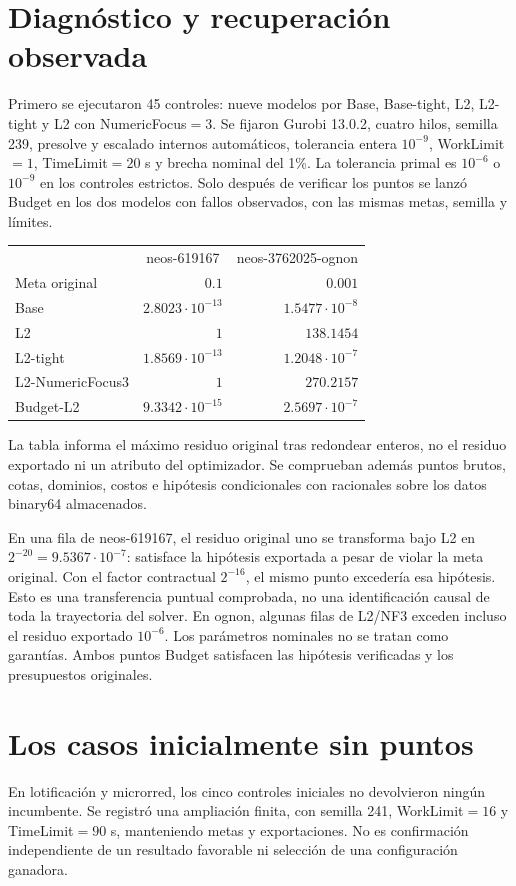 \documentclass[10pt,a4paper]{article}
\begin{document}
\section{Diagnóstico y recuperación observada}
Primero se ejecutaron 45 controles: nueve modelos por Base, Base-tight, L2,
L2-tight y L2 con NumericFocus$=3$. Se fijaron Gurobi 13.0.2, cuatro hilos,
semilla 239, presolve y escalado internos automáticos, tolerancia entera
$10^{-9}$, WorkLimit$=1$, TimeLimit$=20$ s y brecha nominal del 1\%.
La tolerancia primal es $10^{-6}$ o $10^{-9}$ en los controles estrictos.
Solo después de verificar los puntos se lanzó Budget en los dos modelos con
fallos observados, con las mismas metas, semilla y límites.

\begin{center}\small
\begin{tabular}{lrr}\toprule
&\multicolumn{1}{c}{neos-619167}&\multicolumn{1}{c}{neos-3762025-ognon}\\
Meta original&$0.1$&$0.001$\\\midrule
Base&$2.8023\cdot10^{-13}$&$1.5477\cdot10^{-8}$\\
L2&$1$&$138.1454$\\
L2-tight&$1.8569\cdot10^{-13}$&$1.2048\cdot10^{-7}$\\
L2-NumericFocus3&$1$&$270.2157$\\
Budget-L2&$9.3342\cdot10^{-15}$&$2.5697\cdot10^{-7}$\\\bottomrule
\end{tabular}
\end{center}
La tabla informa el máximo residuo original tras redondear enteros, no el residuo
exportado ni un atributo del optimizador. Se comprueban además puntos brutos,
cotas, dominios, costos e hipótesis condicionales con racionales sobre los
datos binary64 almacenados.

En una fila de neos-619167, el residuo original uno se transforma bajo L2 en
$2^{-20}=9.5367\cdot10^{-7}$: satisface la hipótesis exportada a pesar de
violar la meta original. Con el factor contractual $2^{-16}$, el mismo punto
excedería esa hipótesis. Esto es una transferencia puntual comprobada, no una
identificación causal de toda la trayectoria del solver.
En ognon, algunas filas de L2/NF3 exceden incluso el residuo exportado $10^{-6}$.
Los parámetros nominales no se tratan como garantías. Ambos puntos Budget
satisfacen las hipótesis verificadas y los presupuestos originales.

\section{Los casos inicialmente sin puntos}
En lotificación y microrred, los cinco controles iniciales no devolvieron ningún
incumbente. Se registró una ampliación finita, con semilla 241, WorkLimit$=16$
y TimeLimit$=90$ s, manteniendo metas y exportaciones. No es confirmación
independiente de un resultado favorable ni selección de una configuración ganadora.
\end{document}
